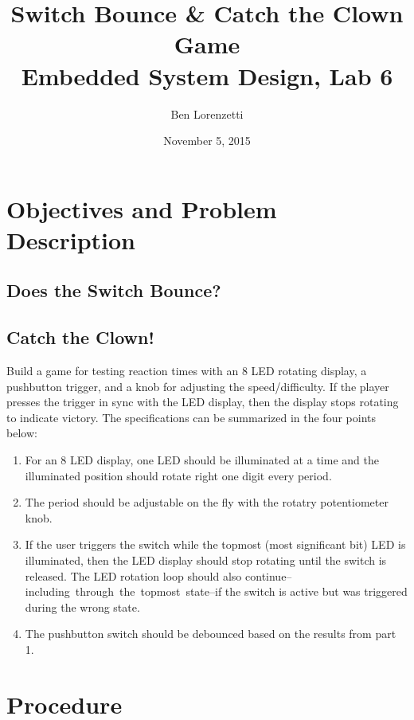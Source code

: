 \documentclass[11pt]{article}
\begin{document}
\title{Switch Bounce \& Catch the Clown Game\\Embedded System Design, Lab 6}
\date{November 5, 2015}
\author{Ben Lorenzetti}
\maketitle

\tableofcontents

\clearpage

\section{Objectives and Problem Description}

\subsection{Does the Switch Bounce?}
\label{switch-debounce-problem-specs}

\subsection{Catch the Clown!}
\label{catch-the-clown-problem-specs}

Build a game for testing reaction times with an 8 LED rotating display,
a pushbutton trigger, and a knob for adjusting the speed/difficulty.
If the player presses the trigger in sync with
the LED display, then the display stops rotating to indicate victory.
The specifications can be summarized in the four points below:
\begin{enumerate}
\item For an 8 LED display, one LED should be illuminated at a time and
the illuminated position should rotate right one digit every period.
\item The period should be adjustable on the fly with the rotatry potentiometer knob.
\item If the user triggers the switch while the topmost (most significant bit) 
LED is illuminated, then the LED display should stop rotating
until the switch is released. The LED rotation loop should also continue--\mbox{including
through the topmost state}--if the switch is active but was triggered
during the wrong state.
\item The pushbutton switch should be debounced based on the results from
part 1.
\end{enumerate}

\section{Procedure}
\end{document}
